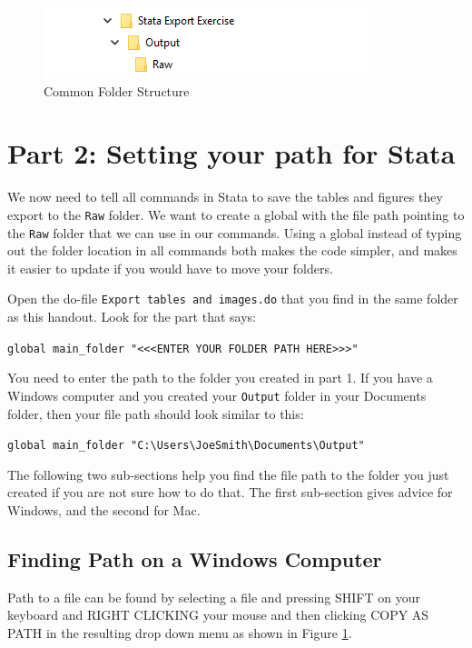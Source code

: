 \documentclass[]{article}
\begin{document}
\begin{figure}[H]
	\centering
	\includegraphics[width=0.6\linewidth]{img/outputRawFolders}
	\caption{Common Folder Structure}
	\label{fig:pathwin3}
\end{figure} 


\section*{Part 2: Setting your path for Stata}
We now need to tell all commands in Stata to save the tables and figures they export to the \texttt{Raw} folder. We want to create a global with the file path pointing to the \texttt{Raw} folder that we can use in our commands. Using a global instead of typing out the folder location in all commands both makes the code simpler, and makes it easier to update if you would have to move your folders.

Open the do-file \texttt{Export tables and images.do} that you find in the same folder as this handout. Look for the part that says:
\begin{center}
	\verb|global main_folder "<<<ENTER YOUR FOLDER PATH HERE>>>"|
\end{center}

You need to enter the path to the folder you created in part 1. If you have a Windows computer and you created your \texttt{Output} folder in your Documents folder, then your file path should look similar to this:
\begin{center}
	\verb|global main_folder "C:\Users\JoeSmith\Documents\Output"|
\end{center}

The following two sub-sections help you find the file path to the folder you just created if you are not sure how to do that. The first sub-section gives advice for Windows, and the second for Mac.

\subsection*{Finding Path on a Windows Computer}

Path to a file can be found by selecting a file and pressing {\color{red}SHIFT on your keyboard and RIGHT CLICKING your mouse and then clicking COPY AS PATH in the resulting drop down menu} as shown in Figure \ref{fig:pathwin3}.
\end{document}
